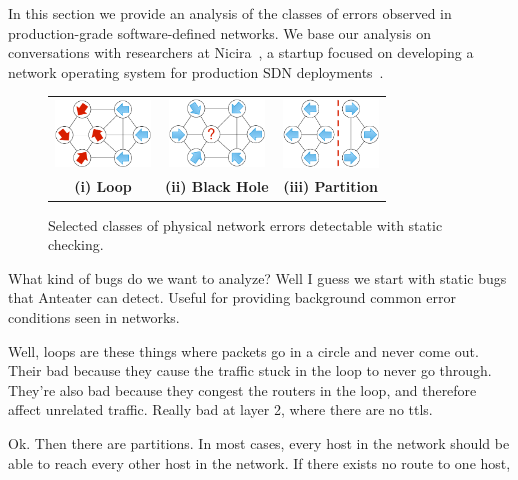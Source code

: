 
In this section we provide an analysis of the classes of errors observed in
production-grade software-defined networks. We base our analysis on conversations with
researchers at Nicira~\cite{nicira}, a startup focused on developing a network operating
system for production SDN deployments~\cite{onix}.

\begin{figure}[t]
    \centering
    \begin{tabular}{ccc}
    \hspace{-3pt}\includegraphics[width=1in]{../diagrams/bugs/loop.pdf}&
    \includegraphics[width=1in]{../diagrams/bugs/dead_end.pdf}&
    \includegraphics[width=1in]{../diagrams/bugs/partition.pdf}\\
    {\bf (i) Loop}&{\bf (ii) Black Hole}&{\bf (iii) Partition}\\
    \end{tabular}
    \caption[]{\label{fig:invariantviolations} Selected classes of physical network errors detectable with static
    checking.\vspace{-10pt}} 
\end{figure}


What kind of bugs do we want to analyze? Well I guess we start with static
bugs that Anteater can detect. Useful for providing background common error
conditions seen in networks. 

Well, loops are these things where packets go in a circle and never come out.
Their bad because they cause the traffic stuck in the loop to never go
through. They're also bad because they congest the routers in the loop, and
therefore affect unrelated traffic. Really bad at layer 2, where there are no
ttls.

Ok. Then there are partitions. In most cases, every host in the network should
be able to reach every other host in the network. If there exists no route to
one host, 

